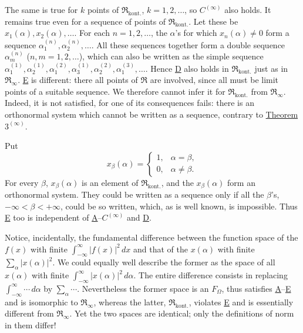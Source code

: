 \documentclass[fontsize=13pt,twoside,openany,headings=normal,parskip=false,bookmarkpackage=false,DIV=calc]{scrbook}
\begin{document}
\hypertarget{origpage-38}{}%
The same is true for $k$ points of $\mathfrak{R}_{\mathrm{kont.}}$, $k=1,2,\ldots$, so \hyperref[ax:II.Cinfty]{$C^{(\infty)}$} also holds. It remains true even for a sequence of points of $\mathfrak{R}_{\mathrm{kont.}}$. Let these be $x_1(\alpha),x_2(\alpha),\ldots$. For each $n=1,2,\ldots$, the $\alpha$'s for which $x_n(\alpha)\ne0$ form a sequence $\alpha_1^{(n)},\alpha_2^{(n)},\ldots$. All these sequences together form a double sequence $\alpha_m^{(n)}$ ($n,m=1,2,\ldots$), which can also be written as the simple sequence $\alpha_1^{(1)},\alpha_2^{(1)},\alpha_1^{(2)},\alpha_3^{(1)},\alpha_2^{(2)},\alpha_1^{(3)},\ldots$. Hence \hyperref[ax:II.D]{D} also holds in $\mathfrak{R}_{\mathrm{kont.}}$ just as in $\mathfrak{R}_\infty$. \hyperref[ax:II.E]{E} is different: there all points of $\mathfrak{R}$ are involved, since all must be limit points of a suitable sequence. We therefore cannot infer it for $\mathfrak{R}_{\mathrm{kont.}}$ from $\mathfrak{R}_\infty$. Indeed, it is not satisfied, for one of its consequences fails: there is an orthonormal system which cannot be written as a sequence, contrary to \hyperref[thm:II.3infty]{Theorem $3^{(\infty)}$}.

Put
\[
x_\beta(\alpha)=\begin{cases}1,&\alpha=\beta,\\0,&\alpha\ne\beta.\end{cases}
\]
For every $\beta$, $x_\beta(\alpha)$ is an element of $\mathfrak{R}_{\mathrm{kont.}}$, and the $x_\beta(\alpha)$ form an orthonormal system. They could be written as a sequence only if all the $\beta$'s, $-\infty<\beta<+\infty$, could be so written, which, as is well known, is impossible. Thus \hyperref[ax:II.E]{E} too is independent of \hyperref[ax:II.A]{A}--\hyperref[ax:II.Cinfty]{$C^{(\infty)}$} and \hyperref[ax:II.D]{D}.

Notice, incidentally, the fundamental difference between the function space of the $f(x)$ with finite $\int_{-\infty}^{\infty}|f(x)|^2\,dx$ and that of the $x(\alpha)$ with finite $\sum_\alpha|x(\alpha)|^2$. We could equally well describe the former as the space of all $x(\alpha)$ with finite $\int_{-\infty}^{\infty}|x(\alpha)|^2\,d\alpha$. The entire difference consists in replacing $\int_{-\infty}^{\infty}\cdots\,d\alpha$ by $\sum_\alpha\cdots$. Nevertheless the former space is an $F_\Omega$, thus satisfies \hyperref[ax:II.A]{A}--\hyperref[ax:II.E]{E} and is isomorphic to $\mathfrak{R}_\infty$, whereas the latter, $\mathfrak{R}_{\mathrm{kont.}}$, violates \hyperref[ax:II.E]{E} and is essentially different from $\mathfrak{R}_\infty$. Yet the two spaces are identical; only the definitions of norm in them differ!
\end{document}
